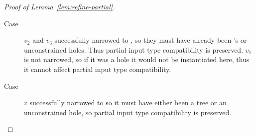 \begin{proof}[Proof of Lemma~\ref{lem:refine-partial}]
\begin{description}
  \item[Case \renodegood]
    $v_2$ and $v_3$ successfully narrowed to , so they must have
    already been 's or unconstrained holes. Thus partial input type
    compatibility is preserved.
    $v_1$ is not narrowed, so if it was a hole it would not be
    instantiated here, thus it cannot affect partial input type compatibility.

  \item[Case ] $v$ successfully narrowed to
    \ttree{\thole} so it must have either been a tree or an
    unconstrained hole, so partial input type compatibility is
    preserved.

  \end{description}
\end{proof}

